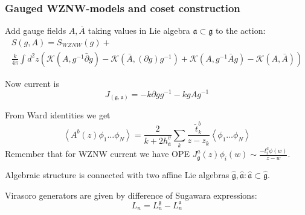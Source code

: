 \documentclass[pdftex]{beamer}
\newcommand{\gf}{\mathfrak{g}}
\newcommand{\gfh}{\hat{\mathfrak{g}}}
\newcommand{\af}{\mathfrak{a}}
\newcommand{\afh}{\hat{\mathfrak{a}}}
\theoremstyle{definition} \newtheorem{Def}{Definition}
\begin{document}
\begin{frame}
  \frametitle{Gauged WZNW-models and coset construction}
  Add gauge fields $A, \bar{A}$ taking values in Lie algebra $\af\subset \gf$ to the action:
  \begin{multline*}
    S(g,A)=S_{WZNW}(g)+\\
    \frac{k}{4\pi}\int d^{2}z \left(\mathcal{K}(A, g^{-1}\bar \partial g)-\mathcal{K}(\bar A, (\partial g ) g^{-1})+\mathcal{K}(A,g^{-1}\bar A g)-\mathcal{K}(A,\bar A)\right)
  \end{multline*}

  Now current is
  \begin{equation*}
    J_{(\gf,\af)}=-k\partial g g^{-1} -k g A g^{-1}
  \end{equation*}

  From Ward identities we get
  \begin{equation*}
    \left< A^{b}(z)\phi_{1}\dots \phi_{N}\right>=\frac{2}{k+2 h^{v}_{\af}}\sum_{k}\frac{\tilde{t}^{b}_{k}}{z-z_{k}}\left<\phi_{1}\dots \phi_{N}\right>
  \end{equation*}
  Remember that for WZNW current we have OPE $J_{\gf}^{a}(z)\phi_{i}(w)\sim \frac{-t^{a}_{i}\phi(w)}{z-w}$.

  Algebraic structure is connected with two affine Lie algebras $\gfh, \afh: \afh\subset\gfh$. 

 Virasoro generators are given by difference of Sugawara expressions:
  \begin{equation*}
    L_{n}=L_{n}^{\gf}-L_{n}^{\af}
  \end{equation*}

\end{frame}
\end{document}
